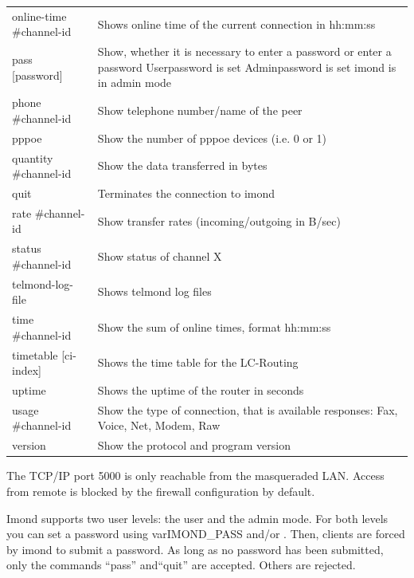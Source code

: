 \begin{table}
\begin{tabular}{lp{9cm}}
      online-time \#channel-id  & Shows online time of the current connection
                                  in hh:mm:ss\\
      pass [password]           & Show, whether it is necessary to enter a
                                  password or enter a password\newline
                                  1 Userpassword is set\newline
                                  2 Adminpassword is set\newline
                                  4 imond is in admin mode\\
      phone \#channel-id        & Show telephone number/name of the peer\\
      pppoe                     & Show the number of pppoe devices (i.e. 0
                                  or 1)\\
      quantity \#channel-id     & Show the data transferred in bytes\\
      quit                      & Terminates the connection to imond\\
      rate \#channel-id         & Show transfer rates (incoming/outgoing
                                  in B/sec)\\
      status \#channel-id       & Show status of channel X\\
      telmond-log-file          & Shows telmond log files\\
      time \#channel-id         & Show the sum of online times, format
                                  hh:mm:ss\\
      timetable [ci-index]      & Shows the time table for the LC-Routing\\
      uptime                    & Shows the uptime of the router in seconds\\
      usage \#channel-id        & Show the type of connection, that is available
                                  responses: Fax, Voice, Net, Modem, Raw\\
      version                   & Show the protocol and program version\\
    \end{tabular}
  \end{table}

The TCP/IP port 5000 is only reachable from the masqueraded LAN.
  Access from remote is blocked by the firewall configuration by default.

  Imond supports two user levels: the user and the admin mode. For both
  levels you can set a password using var{IMOND\_\-PASS} and/or
  . Then, clients are forced by imond to
  submit a password. As long as no password has been submitted, only the
  commands ``pass'' and``quit'' are accepted. Others are rejected.


